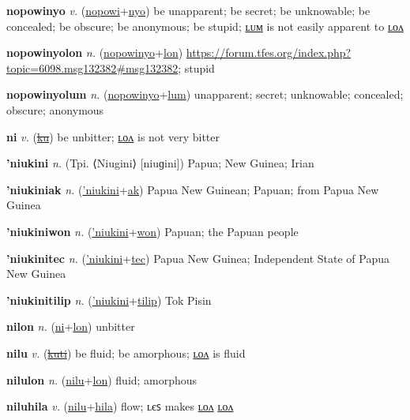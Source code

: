 \textbf{\hypertarget{nopowinyo}{nopowinyo}} \textit{v.} (\hyperlink{nopowi}{nopowi}+\allowbreak \hyperlink{nyo}{nyo})
be unapparent; be secret; be unknowable; be concealed; be obscure; be anonymous; be stupid; \hyperlink{nopowinyolum}{ʟᴜᴍ} is not easily apparent to \hyperlink{nopowinyolon}{ʟᴏᴧ}

\textbf{\hypertarget{nopowinyolon}{nopowinyolon}} \textit{n.} (\hyperlink{nopowinyo}{nopowinyo}+\allowbreak \hyperlink{lon}{lon})
\url{https://forum.tfes.org/index.php?topic=6098.msg132382\#msg132382}; stupid

\textbf{\hypertarget{nopowinyolum}{nopowinyolum}} \textit{n.} (\hyperlink{nopowinyo}{nopowinyo}+\allowbreak \hyperlink{lum}{lum})
unapparent; secret; unknowable; concealed; obscure; anonymous

\textbf{\hypertarget{ni}{ni}} \textit{v.} (\hyperlink{ku}{\sout{ku}})
be unbitter; \hyperlink{nilon}{ʟᴏᴧ} is not very bitter

\textbf{\hypertarget{'niukini}{'niukini}} \textit{n.} (Tpi. ⟨Niugini⟩ [niuɡini])
Papua; New Guinea; Irian

\textbf{\hypertarget{'niukiniak}{'niukiniak}} \textit{n.} (\hyperlink{'niukini}{'niukini}+\allowbreak \hyperlink{ak}{ak})
Papua New Guinean; Papuan; from Papua New Guinea

\textbf{\hypertarget{'niukiniwon}{'niukiniwon}} \textit{n.} (\hyperlink{'niukini}{'niukini}+\allowbreak \hyperlink{won}{won})
Papuan; the Papuan people

\textbf{\hypertarget{'niukinitec}{'niukinitec}} \textit{n.} (\hyperlink{'niukini}{'niukini}+\allowbreak \hyperlink{tec}{tec})
Papua New Guinea; Independent State of Papua New Guinea

\textbf{\hypertarget{'niukinitilip}{'niukinitilip}} \textit{n.} (\hyperlink{'niukini}{'niukini}+\allowbreak \hyperlink{tilip}{tilip})
Tok Pisin

\textbf{\hypertarget{nilon}{nilon}} \textit{n.} (\hyperlink{ni}{ni}+\allowbreak \hyperlink{lon}{lon})
unbitter

\textbf{\hypertarget{nilu}{nilu}} \textit{v.} (\hyperlink{kuti}{\sout{kuti}})
be fluid; be amorphous; \hyperlink{nilulon}{ʟᴏᴧ} is fluid

\textbf{\hypertarget{nilulon}{nilulon}} \textit{n.} (\hyperlink{nilu}{nilu}+\allowbreak \hyperlink{lon}{lon})
fluid; amorphous

\textbf{\hypertarget{niluhila}{niluhila}} \textit{v.} (\hyperlink{nilu}{nilu}+\allowbreak \hyperlink{hila}{hila})
flow; ʟєꜱ makes \hyperlink{niluhilalon}{ʟᴏᴧ} \hyperlink{niluhilalon}{ʟᴏᴧ}

